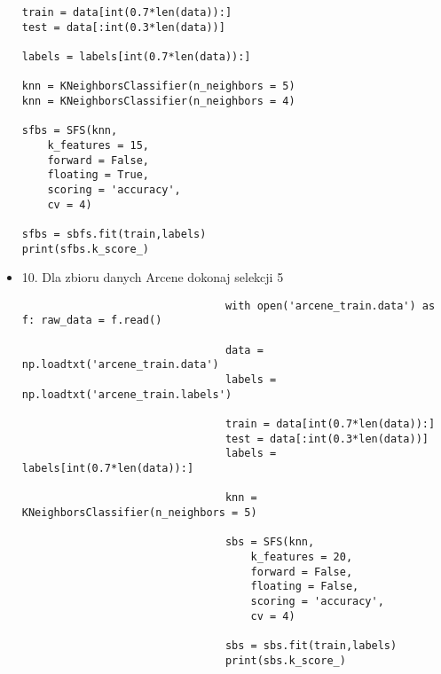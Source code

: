 \documentclass[12pt,a4paper]{article}
\begin{document}
\begin{itemize}
\begin{lstlisting}
train = data[int(0.7*len(data)):]
test = data[:int(0.3*len(data))]
 
labels = labels[int(0.7*len(data)):]
 
knn = KNeighborsClassifier(n_neighbors = 5)
knn = KNeighborsClassifier(n_neighbors = 4)
 
sfbs = SFS(knn,
    k_features = 15,
    forward = False,
    floating = True,
    scoring = 'accuracy',
    cv = 4)
   
sfbs = sbfs.fit(train,labels)
print(sfbs.k_score_)
                \end{lstlisting}
                        
                        \clearpage

                        \item 10. Dla zbioru danych Arcene dokonaj selekcji 5%
                        \begin{lstlisting}
                                with open('arcene_train.data') as f: raw_data = f.read()
 
                                data = np.loadtxt('arcene_train.data')
                                labels = np.loadtxt('arcene_train.labels')
                                 
                                train = data[int(0.7*len(data)):]
                                test = data[:int(0.3*len(data))]
                                labels = labels[int(0.7*len(data)):]
                                 
                                knn = KNeighborsClassifier(n_neighbors = 5)
                                 
                                sbs = SFS(knn,
                                    k_features = 20,
                                    forward = False,
                                    floating = False,
                                    scoring = 'accuracy',
                                    cv = 4)
                                   
                                sbs = sbs.fit(train,labels)
                                print(sbs.k_score_)
                        \end{lstlisting}
                                

\end{itemize}
\end{document}
